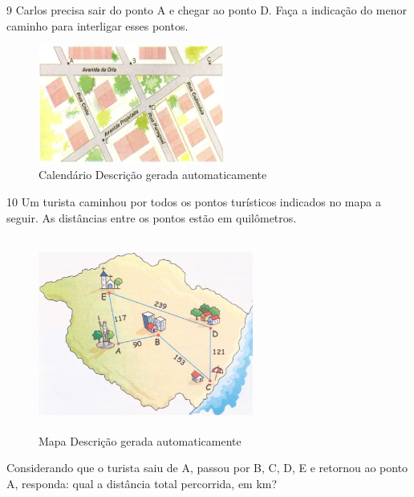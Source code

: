 \begin{escolha}
\begin{escolha}
\begin{escolha}
\begin{escolha}
{\begin{boxmedio}
\begin{boxpeq}
\begin{q°}
\begin{boxmedio}
\begin{boxpeq}
\begin{boxpeq}
\begin{boxmedio}
\begin{boxmedio}
\begin{boxmedio}
\num{9} Carlos precisa sair do ponto A e chegar ao ponto D. Faça a indicação
do menor caminho para interligar esses pontos.

\begin{figure}
\centering
\includegraphics[width=2.40278in,height=1.53858in]{./_SAEB_9_MAT/media/image209.jpeg}
\caption{Calendário Descrição gerada automaticamente}
\end{figure}



\num{10} Um turista caminhou por todos os pontos turísticos indicados no mapa a seguir.
As distâncias entre os pontos estão em quilômetros.

\begin{figure}
\centering
\includegraphics[width=2.77778in,height=2.5in]{./_SAEB_9_MAT/media/image210.png}
\caption{Mapa Descrição gerada automaticamente}
\end{figure}


Considerando que o turista saiu de A, passou por B, C, D, E e retornou ao ponto A,
responda: qual a distância total percorrida, em km?



\end{boxmedio}
\end{boxmedio}
\end{boxmedio}
\end{boxpeq}
\end{boxpeq}
\end{boxmedio}
\end{q°}
\end{boxpeq}
\end{boxmedio}}
\end{escolha}
\end{escolha}
\end{escolha}
\end{escolha}
